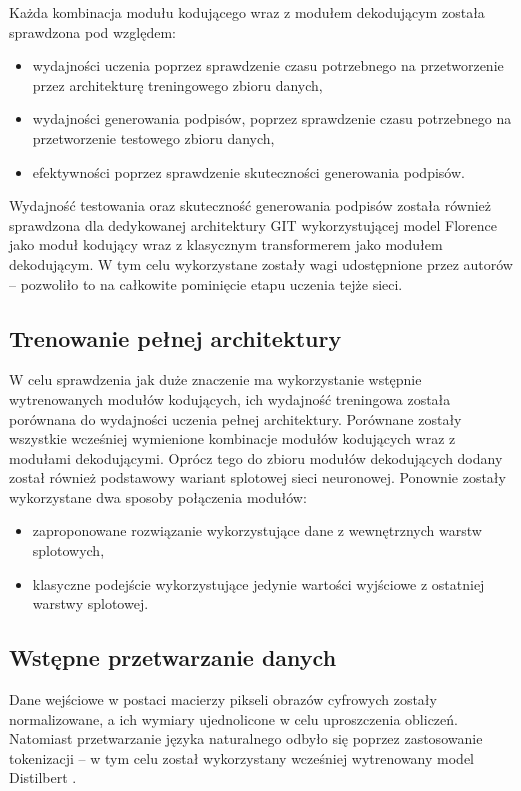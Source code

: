 Każda kombinacja modułu kodującego wraz z modułem dekodującym została sprawdzona pod względem:
\begin{itemize}
    \item wydajności uczenia poprzez sprawdzenie czasu potrzebnego na przetworzenie przez architekturę treningowego zbioru danych,
    \item wydajności generowania podpisów, poprzez sprawdzenie czasu potrzebnego na przetworzenie testowego zbioru danych,
    \item efektywności poprzez sprawdzenie skuteczności generowania podpisów.
\end{itemize}
Wydajność testowania oraz skuteczność generowania podpisów została również sprawdzona dla dedykowanej architektury GIT \cite{wang2022git} wykorzystującej model Florence \cite{florence} jako moduł kodujący wraz z klasycznym transformerem jako modułem dekodującym. W tym celu wykorzystane zostały wagi udostępnione przez autorów -- pozwoliło to na całkowite pominięcie etapu uczenia tejże sieci.
\subsection{Trenowanie pełnej architektury}
W celu sprawdzenia jak duże znaczenie ma wykorzystanie wstępnie wytrenowanych modułów kodujących, ich wydajność treningowa została porównana do wydajności uczenia pełnej architektury. Porównane zostały wszystkie wcześniej wymienione kombinacje modułów kodujących wraz z modułami dekodującymi. Oprócz tego do zbioru modułów dekodujących dodany został również podstawowy wariant splotowej sieci neuronowej. Ponownie zostały wykorzystane dwa sposoby połączenia modułów: \begin{itemize}
    \item zaproponowane rozwiązanie wykorzystujące dane z wewnętrznych warstw splotowych,
    \item klasyczne podejście wykorzystujące jedynie wartości wyjściowe z ostatniej warstwy splotowej.
\end{itemize}
\subsection{Wstępne przetwarzanie danych}
Dane wejściowe w postaci macierzy pikseli obrazów cyfrowych zostały normalizowane, a ich wymiary ujednolicone w celu uproszczenia obliczeń. Natomiast przetwarzanie języka naturalnego odbyło się poprzez zastosowanie tokenizacji -- w tym celu został wykorzystany wcześniej wytrenowany model Distilbert \cite{distilbert}.
